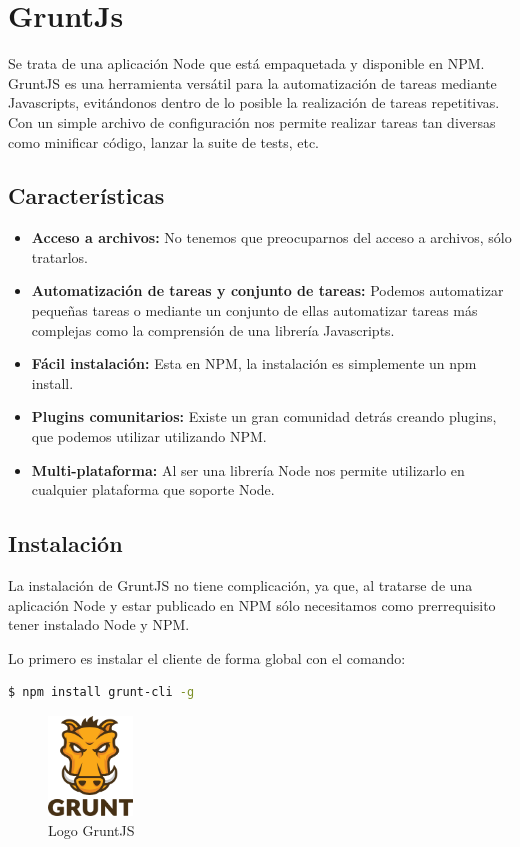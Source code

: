 \section{GruntJs}

Se trata de una aplicación Node que está empaquetada y disponible en NPM. GruntJS es una herramienta versátil para la automatización de tareas mediante Javascripts, evitándonos dentro de lo posible la realización de tareas repetitivas. Con un simple archivo de configuración nos permite realizar tareas tan diversas como minificar código, lanzar la suite de tests, etc.


\subsection{Características}

\begin{itemize}
\item \textbf{Acceso a archivos:}
	No tenemos que preocuparnos del acceso a archivos, sólo tratarlos.	
\item \textbf{Automatización de tareas y conjunto de tareas:}
	Podemos automatizar pequeñas tareas o mediante un conjunto de ellas automatizar tareas más complejas como la comprensión de una librería Javascripts. 
\item \textbf{Fácil instalación:}
	Esta en NPM, la instalación es simplemente un npm install.
\item \textbf{Plugins comunitarios:}
	Existe un gran comunidad detrás creando plugins, que podemos utilizar utilizando NPM.
\item \textbf{Multi-plataforma:}
	Al ser una librería Node nos permite utilizarlo en cualquier plataforma que soporte Node.
\end{itemize}

\subsection{Instalación}
La instalación de GruntJS no tiene complicación, ya que, al tratarse de una aplicación Node y estar publicado en NPM sólo necesitamos como prerrequisito tener instalado Node y NPM.

Lo primero es instalar el cliente de forma global con el comando:

\begin{lstlisting}[language=bash, numbers=none]
$ npm install grunt-cli -g
\end{lstlisting}

\begin{figure}
  \begin{center}
    \includegraphics[width=0.2\textwidth]{imagenes/grunt-logo}
  \end{center}
  \caption{Logo GruntJS}
  \label{fig:gruntjs}
\end{figure}

